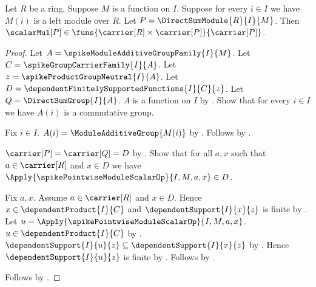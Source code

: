 \begin{proposition}\label{spike_direct_sum_module_scalar_type}
    Let $R$ be a ring.
    Suppose $M$ is a function on $I$.
    Suppose for every $i\in I$ we have $M(i)$ is a left module over $R$.
    Let $P=\DirectSumModule{R}{I}{M}$.
    Then
        $\scalarMul[P]\in
            \funs{\carrier[R]\times\carrier[P]}{\carrier[P]}$.
\end{proposition}
\begin{proof}
    Let $A=\spikeModuleAdditiveGroupFamily{I}{M}$.
    Let $C=\spikeGroupCarrierFamily{I}{A}$.
    Let $z=\spikeProductGroupNeutral{I}{A}$.
    Let $D=\dependentFinitelySupportedFunctions{I}{C}{z}$.
    Let $Q=\DirectSumGroup{I}{A}$.
    $A$ is a function on $I$ by
        .
    Show that for every $i\in I$ we have
        $A(i)$ is a commutative group.
    \begin{subproof}
        Fix $i\in I$.
        $A(i)=\ModuleAdditiveGroup{M(i)}$ by
            .
        Follows by .
    \end{subproof}
    $\carrier[P]=\carrier[Q]=D$ by
        .
    Show that for all $a,x$ such that $a\in\carrier[R]$ and
        $x\in D$ we have
        $\Apply{\spikePointwiseModuleScalarOp}{I,M,a,x}\in D$.
    \begin{subproof}
        Fix $a,x$.
        Assume $a\in\carrier[R]$ and $x\in D$.
        Hence $x\in\dependentProduct{I}{C}$ and
            $\dependentSupport{I}{x}{z}$ is finite by
            .
        Let $u=\Apply{\spikePointwiseModuleScalarOp}{I,M,a,x}$.
        $u\in\dependentProduct{I}{C}$ by
            .
        $\dependentSupport{I}{u}{z}
            \subseteq\dependentSupport{I}{x}{z}$ by
            .
        Hence $\dependentSupport{I}{u}{z}$ is finite by
            .
        Follows by
            .
    \end{subproof}
    Follows by
        .
\end{proof}

